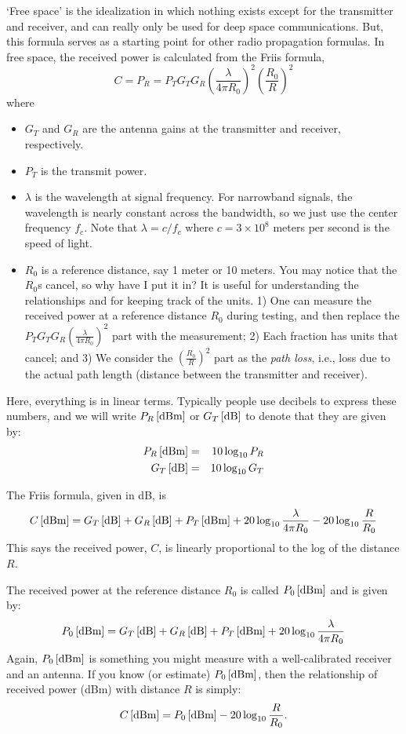 `Free space' is the idealization in which nothing exists except for
the transmitter and receiver, and can really only be used for deep space
communications.  But, this formula serves as a starting point for other
radio propagation formulas.  In free space, the received power is calculated from
the Friis formula,
\[
C = P_R = P_T G_T G_R \left(\frac{ \lambda}{4\pi R_0}\right)^2 
\left( \frac{ R_0}{R}\right)^2
\]
where
\begin{itemize}
  \item $G_T$ and $G_R$ are the antenna gains at the transmitter and
  receiver, respectively.
  \item $P_T$ is the transmit power.
  \item $\lambda$ is the wavelength at signal frequency.
  For narrowband signals, the wavelength is nearly constant across
  the bandwidth, so we just use the center frequency $f_c$.  Note
  that $\lambda = c / f_c$ where $c = 3\times 10^8$ meters per
  second is the speed of light.
  \item $R_0$ is a reference distance, say 1 meter or 10 meters. You may notice that the $R_0$s cancel, so why have I put it in?  It is useful for understanding the relationships and for keeping track of the units. 1) One can measure the received power at a reference distance $R_0$ during testing, and then replace the $P_T G_T G_R \left(\frac{ \lambda}{4\pi R_0}\right)^2$ part with the measurement; 2) Each fraction has units that cancel; and 3) We consider the $\left( \frac{ R_0}{R}\right)^2$ part as the \emph{path loss}, i.e., loss due to the actual path length (distance between the transmitter and receiver).
\end{itemize}
Here, everything is in linear terms.  Typically people use decibels
to express these numbers, and we will write ${P_R}\left[\mbox{dBm}\right]$ or
${G_T}\left[\mbox{dB}\right]$ to denote that they are given by:
\begin{eqnarray}
  {P_R}\left[\mbox{dBm}\right]  &=& 10 \log_{10} P_R \nonumber \\ 
  {G_T}\left[\mbox{dB}\right] &=& 10 \log_{10} G_T \nonumber \\ 
\end{eqnarray}

The Friis formula, given in dB, is
\begin{equation} \label{E:FriisIndB}
 {C}\left[\mbox{dBm}\right] = {G_T}\left[\mbox{dB}\right] + {G_R}\left[\mbox{dB}\right]  + {P_T}\left[\mbox{dBm}\right] + 20 \log_{10} \frac{\lambda}{4\pi R_0} - 20 \log_{10} \frac{R}{R_0} 
\end{equation}
This says the received power, $C$, is linearly proportional to the log of the distance $R$.  

The received power at the reference distance $R_0$ is called ${P_0}\left[\mbox{dBm}\right]$ and is given by:
\begin{equation} \label{E:P0_formula}
 {P_0}\left[\mbox{dBm}\right] = {G_T}\left[\mbox{dB}\right] + {G_R}\left[\mbox{dB}\right]  + {P_T}\left[\mbox{dBm}\right] + 20 \log_{10} \frac{\lambda}{4\pi R_0}
\end{equation}
Again, ${P_0}\left[\mbox{dBm}\right]$  is something you might measure with a well-calibrated receiver and an antenna.  If you know (or estimate) ${P_0}\left[\mbox{dBm}\right]$, then the relationship of received power (dBm) with distance $R$ is simply:
\begin{equation} \label{E:FriisIndBSimple}
 {C}\left[\mbox{dBm}\right] = {P_0}\left[\mbox{dBm}\right] - 20 \log_{10} \frac{R}{R_0} .
\end{equation}



